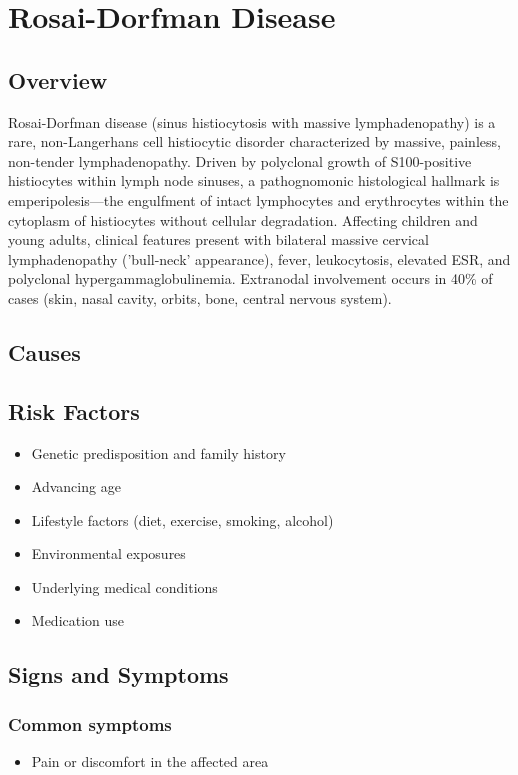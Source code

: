\chapter{Rosai-Dorfman Disease}
\label{sec:Rosai-Dorfman Disease}

\section{Overview}
Rosai-Dorfman disease (sinus histiocytosis with massive lymphadenopathy) is a rare, non-Langerhans cell histiocytic disorder characterized by massive, painless, non-tender lymphadenopathy. Driven by polyclonal growth of S100-positive histiocytes within lymph node sinuses, a pathognomonic histological hallmark is emperipolesis---the engulfment of intact lymphocytes and erythrocytes within the cytoplasm of histiocytes without cellular degradation. Affecting children and young adults, clinical features present with bilateral massive cervical lymphadenopathy ('bull-neck' appearance), fever, leukocytosis, elevated ESR, and polyclonal hypergammaglobulinemia. Extranodal involvement occurs in 40\% of cases (skin, nasal cavity, orbits, bone, central nervous system).
\section{Causes}
\section{Risk Factors}

\begin{itemize}[noitemsep]
  \item Genetic predisposition and family history
  \item Advancing age
  \item Lifestyle factors (diet, exercise, smoking, alcohol)
  \item Environmental exposures
  \item Underlying medical conditions
  \item Medication use
\end{itemize}
\section{Signs and Symptoms}

\subsection{Common symptoms}
\begin{itemize}[noitemsep]
  \item Pain or discomfort in the affected area
  \end{itemize}

